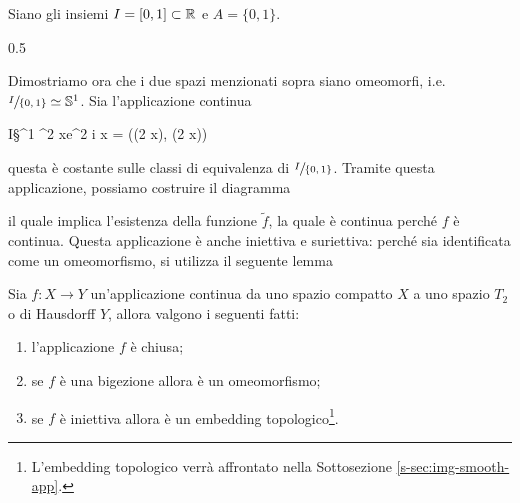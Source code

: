 Siano gli insiemi $ I = [0,1] \subset \mathbb{R} $ e $ A = \{0,1\} $. 

	{0.5}{%
			}
		
Dimostriamo ora che i due spazi menzionati sopra siano omeomorfi, i.e. $ \sfrac{I}{\{0,1\}} \simeq \mathbb{S}^{1} $. Sia l'applicazione continua

%
	{I}{\S^{1} \subset \R^{2}}%
	{x}{e^{2 i \pi x} = (\cos(2 \pi x), \sin(2 \pi x))}

questa è costante sulle classi di equivalenza di $ \sfrac{I}{\{0,1\}} $. Tramite questa applicazione, possiamo costruire il diagramma


il quale implica l'esistenza della funzione $ \tilde{f} $, la quale è continua perché $ f $ è continua. Questa applicazione è anche iniettiva e suriettiva: perché sia identificata come un omeomorfismo, si utilizza il seguente lemma

\begin{lemma}\label{lemma:clos-app}
	
	Sia $ f : X \to Y $ un'applicazione continua da uno spazio compatto $ X $ a uno spazio $ T_{2} $ o di Hausdorff $ Y $, allora valgono i seguenti fatti:
	
	\begin{enumerate}
		\item l'applicazione $ f $ è chiusa;
		
		\item se $ f $ è una bigezione allora è un omeomorfismo;
		
		\item se $ f $ è iniettiva allora è un embedding topologico\footnote{%
			L'embedding topologico verrà affrontato nella Sottosezione \ref{s-sec:img-smooth-app}.%
		}.
	\end{enumerate}
\end{lemma}

